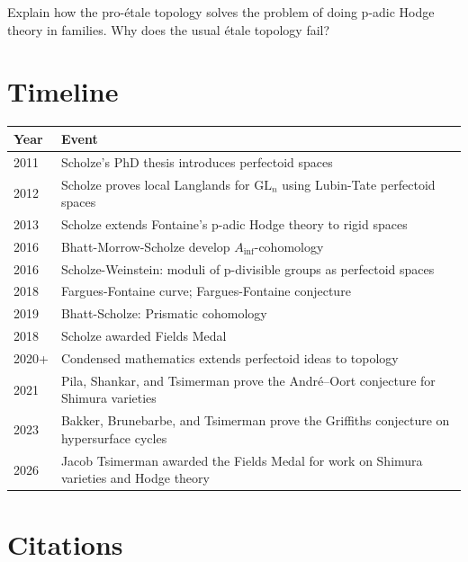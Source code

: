 \begin{exercise}[Challenge]
Explain how the pro-\'etale topology solves the problem of doing p-adic Hodge theory in families. Why does the usual \'etale topology fail?
\end{exercise}

\section{Timeline}

\begin{tabularx}{\linewidth}{lX}
\toprule
\textbf{Year} & \textbf{Event} \\ \midrule
2011 & Scholze's PhD thesis introduces perfectoid spaces \\ 
2012 & Scholze proves local Langlands for $\text{GL}_n$ using Lubin-Tate perfectoid spaces \\

2013 & Scholze extends Fontaine's p-adic Hodge theory to rigid spaces \\
2016 & Bhatt-Morrow-Scholze develop $A_{\text{inf}}$-cohomology \\

2016 & Scholze-Weinstein: moduli of p-divisible groups as perfectoid spaces \\

2018 & Fargues-Fontaine curve; Fargues-Fontaine conjecture \\

2019 & Bhatt-Scholze: Prismatic cohomology \\

2018 & Scholze awarded Fields Medal \\

2020+ & Condensed mathematics extends perfectoid ideas to topology \\
2021 & Pila, Shankar, and Tsimerman prove the Andr\'e--Oort conjecture for Shimura varieties \\
2023 & Bakker, Brunebarbe, and Tsimerman prove the Griffiths conjecture on hypersurface cycles \\
2026 & Jacob Tsimerman awarded the Fields Medal for work on Shimura varieties and Hodge theory \\
\bottomrule
\end{tabularx}

\section{Citations}

